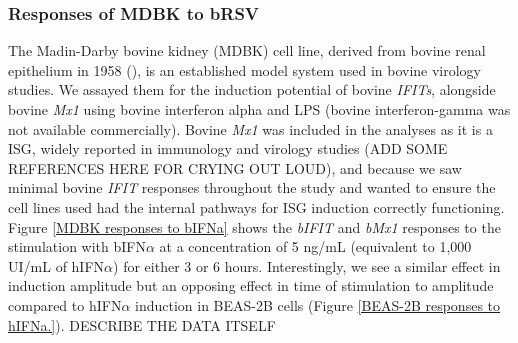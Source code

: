 \subsubsection{Responses of MDBK to bRSV} \label{Responses of MDBK to bRSV}


The Madin-Darby bovine kidney (MDBK) cell line, derived from bovine renal epithelium in 1958 (\cite{Madin1958EstablishedOrigin}), is an established model system used in bovine virology studies. We assayed them for the induction potential of bovine \textit{IFITs}, alongside bovine \textit{Mx1} using bovine interferon alpha and LPS (bovine interferon-gamma was not available commercially). Bovine \textit{Mx1} was included in the analyses as it is a ISG, widely reported in immunology and virology studies (ADD SOME REFERENCES HERE FOR CRYING OUT LOUD), and because we saw minimal bovine \textit{IFIT} responses throughout the study and wanted to ensure the cell lines used had the internal pathways for ISG induction correctly functioning. Figure \ref{MDBK responses to bIFNa} shows the \textit{bIFIT} and \textit{bMx1} responses to the stimulation with bIFN\(\alpha\) at a concentration of 5 ng/mL (equivalent to 1,000 UI/mL of hIFN\(\alpha\)) for either 3 or 6 hours. Interestingly, we see a similar effect in induction amplitude but an opposing effect in time of stimulation to amplitude compared to hIFN\(\alpha\) induction in BEAS-2B cells (Figure \ref{BEAS-2B responses to hIFNa.}). DESCRIBE THE DATA ITSELF






